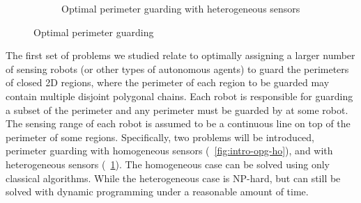 \begin{figure}[h]
\begin{subfigure}[b]{0.4\textwidth}
        \caption{Optimal perimeter guarding with heterogeneous sensors}
        \label{fig:intro-opg-he}
    \end{subfigure}
    \caption{Optimal perimeter guarding}
    \label{fig:intro-opg}
\end{figure}


The first set of problems we studied relate to optimally assigning a larger number of sensing
robots (or other types of autonomous agents) to guard the perimeters of closed 2D regions,
where the perimeter of each region to be guarded may contain multiple disjoint polygonal chains.
Each robot is responsible for guarding a subset of the perimeter and any perimeter must be guarded
by at some robot.
The sensing range of each robot is assumed to be a continuous line on top of the perimeter of some regions. 
Specifically, two problems will be introduced, perimeter guarding with homogeneous sensors (~\ref{fig:intro-opg-ho}),
and with heterogeneous sensors (~\ref{fig:intro-opg-he}). 
The homogeneous case can be solved using only classical algorithms. 
While the heterogeneous case is NP-hard, but can still be solved with dynamic programming under a reasonable
amount of time. 


